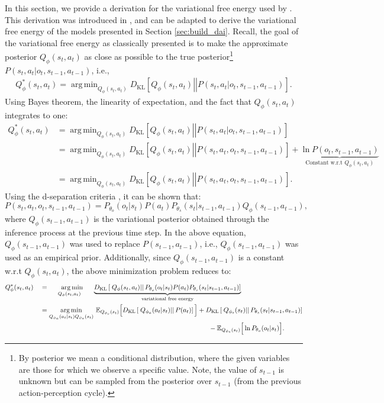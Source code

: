 \documentclass[twoside,11pt]{article}
\newcommand{\kl}[2]{D_{\mathrm{KL}} \left[ \left. \left. #1 \right|\right| #2 \right] }
\DeclareMathOperator*{\argmin}{arg\,min}
\begin{document}
In this section, we provide a derivation for the variational free energy used by \citet{DeepAIwithMCMC}. This derivation was introduced in \citep{DeepAI}, and can be adapted to derive the variational free energy of the models presented in Section \ref{sec:build_dai}. Recall, the goal of the variational free energy as classically presented is to make the approximate posterior $Q_\phi(s_t,a_t)$ as close as possible to the true posterior\footnote{By posterior we mean a conditional distribution, where the given variables are those for which we observe a specific value. Note, the value of $s_{t-1}$ is unknown but can be sampled from the posterior over $s_{t-1}$ (from the previous action-perception cycle).} $P(s_t,a_t|o_t,s_{t-1},a_{t-1})$, i.e.,
\begin{align*}
Q^*_\phi(s_t,a_t) = \argmin_{Q_\phi(s_t,a_t)} \kl{Q_\phi(s_t,a_t)}{P(s_t,a_t|o_t,s_{t-1},a_{t-1})}.
\end{align*}
Using Bayes theorem, the linearity of expectation, and the fact that $Q_\phi(s_t,a_t)$ integrates to one:
\begin{align*}
Q_\phi^*(s_t,a_t) &= \argmin_{Q_\phi(s_t,a_t)} \kl{Q_\phi(s_t,a_t)}{P(s_t,a_t|o_t,s_{t-1},a_{t-1})}\\
&= \argmin_{Q_\phi(s_t,a_t)} \kl{Q_\phi(s_t,a_t)}{P(s_t,a_t,o_t,s_{t-1},a_{t-1})} + \underbrace{\ln P(o_t,s_{t-1},a_{t-1})}_{\text{Constant w.r.t }Q_\phi(s_t,a_t)}\\
&= \argmin_{Q_\phi(s_t,a_t)} \kl{Q_\phi(s_t,a_t)}{P(s_t,a_t,o_t,s_{t-1},a_{t-1})}.
\end{align*}
Using the d-separation criteria \citep{koller2009probabilistic}, it can be shown that:
$$P(s_t,a_t,o_t,s_{t-1},a_{t-1}) = P_{\theta_o}(o_t|s_t)P(a_t)P_{\theta_s}(s_t|s_{t-1},a_{t-1})Q_{\phi}(s_{t-1}, a_{t-1}),$$
where $Q_\phi(s_{t-1}, a_{t-1})$ is the variational posterior obtained through the inference process at the previous time step. In the above equation, $Q_\phi(s_{t-1}, a_{t-1})$ was used to replace $P(s_{t-1}, a_{t-1})$, i.e., $Q_\phi(s_{t-1}, a_{t-1})$ was used as an empirical prior. Additionally, since $Q_\phi(s_{t-1}, a_{t-1})$ is a constant w.r.t $Q_\phi(s_t,a_t)$, the above minimization problem reduces to:
\begin{align}
Q^*_{\phi}(s_t,a_t)\quad &= \,\, \argmin_{\quad Q_{\phi}(s_t,a_t) \,\,\,\,\,\, \quad }\underbrace{\kl{Q_{\phi}(s_t,a_t)}{P_{\theta_o}(o_t|s_t)P(a_t)P_{\theta_s}(s_t|s_{t-1},a_{t-1})}}_{\text{variational free energy}}\label{eq:def_vfe_fountas}\\
&= \argmin_{Q_{\phi_a}(a_t|s_t)Q_{\phi_s}(s_t)}\, \mathbb{E}_{Q_{\phi_s}(s_t)}\Big[ \kl{Q_{\phi_a}(a_t|s_t)}{P(a_t)} \Big] + \kl{Q_{\phi_s}(s_t)}{P_{\theta_s}(s_t|s_{t-1},a_{t-1})}\nonumber\\
&\hspace{8.9cm}- \mathbb{E}_{Q_{\phi_s}(s_t)}\Big[\ln P_{\theta_o}(o_t|s_t)\Big].\nonumber
\end{align}
\end{document}
